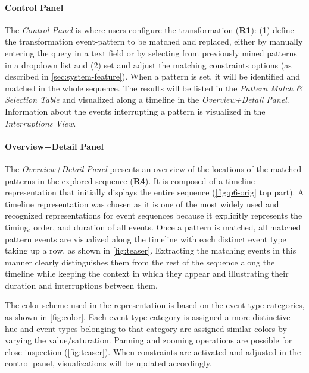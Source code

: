 \documentclass[camera]{vgtc}                          %
\begin{document}
\paragraph{Control Panel}
The \textit{Control Panel} is where users configure the transformation (\textbf{R1}): (1) define the transformation event-pattern to be matched and replaced, either by manually entering the query in a text field or by selecting from previously mined patterns in a dropdown list and (2) set and adjust the matching constraints options (as described in \autoref{sec:system-feature}).
When a pattern is set, it will be identified and matched in the whole sequence. The results will be listed in the \textit{Pattern Match \& Selection Table} and visualized along a timeline in the \textit{Overview+Detail Panel}. Information about the events interrupting a pattern is visualized in the \textit{Interruptions View}.

\paragraph{Overview+Detail Panel}
The \textit{Overview+Detail Panel} presents an overview of the locations of the matched patterns in the explored sequence (\textbf{R4}).
It is composed of a timeline representation that initially displays the entire sequence (\autoref{fig:p6-orig} top part). 
A timeline representation was chosen as it is one of the most widely used and recognized representations for event sequences because it explicitly represents the timing, order, and duration of all events. 
Once a pattern is matched, all matched pattern events are visualized along the timeline with each distinct event type taking up a row, as shown in \autoref{fig:teaser}. 
Extracting the matching events in this manner clearly distinguishes them from the rest of the sequence along the timeline while keeping the context in which they appear and illustrating their duration and interruptions between them.

The color scheme used in the representation is based on the event type categories, as shown in \autoref{fig:color}. Each event-type category is assigned a more distinctive hue and event types belonging to that category are assigned similar colors by varying the value/saturation.
Panning and zooming operations are possible for close inspection (\autoref{fig:teaser}). 
When constraints are activated and adjusted in the control panel, visualizations will be updated accordingly.
\end{document}

